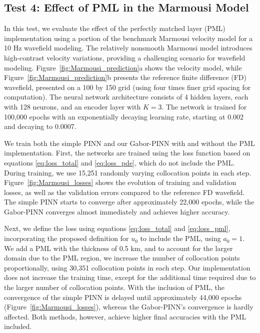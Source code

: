 \documentclass[authoryear, preprint, 12pt]{elsarticle}
\begin{document}
\subsection{Test 4: Effect of PML in the Marmousi Model}

In this test, we evaluate the effect of the perfectly matched layer (PML) implementation using a portion of the benchmark Marmousi velocity model for a 10 Hz wavefield modeling. The relatively nonsmooth Marmousi model introduces high-contrast velocity variations, providing a challenging scenario for wavefield modeling. Figure~\ref{fig:Marmousi_prediction}a shows the velocity model, while Figure~\ref{fig:Marmousi_prediction}b presents the reference finite difference (FD) wavefield, presented on a 100 by 150 grid (using four times finer grid spacing for computation). The neural network architecture consists of 4 hidden layers, each with 128 neurons, and an encoder layer with \( K = 3 \). The network is trained for 100,000 epochs with an exponentially decaying learning rate, starting at 0.002 and decaying to 0.0007.

We train both the simple PINN and our Gabor-PINN with and without the PML implementation. First, the networks are trained using the loss function based on equations \eqref{eq:loss_total} and \eqref{eq:loss_pde}, which do not include the PML. During training, we use 15,251 randomly varying collocation points in each step. Figure~\ref{fig:Marmousi_losses} shows the evolution of training and validation losses, as well as the validation errors compared to the reference FD wavefield. The simple PINN starts to converge after approximately 22,000 epochs, while the Gabor-PINN converges almost immediately and achieves higher accuracy.

Next, we define the loss using equations \eqref{eq:loss_total} and \eqref{eq:loss_pml}, incorporating the proposed definition for \( u_0 \) to include the PML, using $a_0=1$. We add a PML with the thickness of 0.5 km, and to account for the larger domain due to the PML region, we increase the number of collocation points proportionally, using 30,351 collocation points in each step. Our implementation does not increase the training time, except for the additional time required due to the larger number of collocation points. With the inclusion of PML, the convergence of the simple PINN is delayed until approximately 44,000 epochs (Figure~\ref{fig:Marmousi_losses}), whereas the Gabor-PINN's convergence is hardly affected. Both methods, however, achieve higher final accuracies with the PML included.
\end{document}
